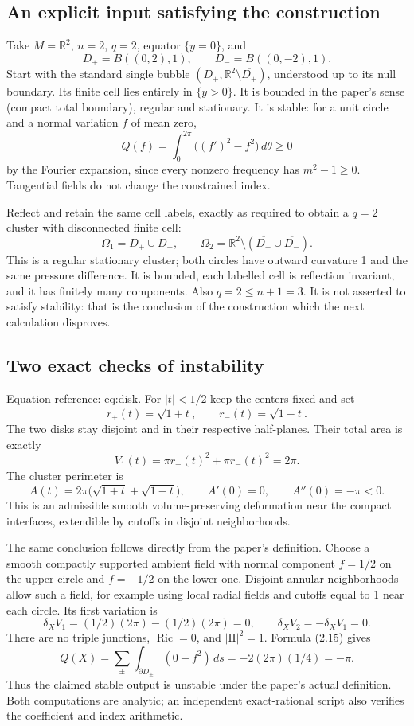 \documentclass[10pt]{article}
\begin{document}
\subsection*{An explicit input satisfying the construction}
Take \(M=\mathbb R^2\), \(n=2\), \(q=2\), equator \(\{y=0\}\), and \[D_+=B((0,2),1),\qquad D_-=B((0,-2),1).\] Start with the standard single bubble \((D_+,\mathbb R^2\setminus\overline{D_+})\), understood up to its null boundary. Its finite cell lies entirely in \(\{y>0\}\). It is bounded in the paper’s sense (compact total boundary), regular and stationary. It is stable: for a unit circle and a normal variation \(f\) of mean zero, \[Q(f)=\int_0^{2\pi}\bigl((f')^2-f^2\bigr)\,d\theta\geq0\] by the Fourier expansion, since every nonzero frequency has \(m^2-1\geq0\). Tangential fields do not change the constrained index.\par
Reflect and retain the same cell labels, exactly as required to obtain a \(q=2\) cluster with disconnected finite cell: \[\Omega_1=D_+\cup D_-,\qquad
 \Omega_2=\mathbb R^2\setminus(\overline{D_+}\cup\overline{D_-}).\] This is a regular stationary cluster; both circles have outward curvature 1 and the same pressure difference. It is bounded, each labelled cell is reflection invariant, and it has finitely many components. Also \(q=2\leq n+1=3\). It is not asserted to satisfy stability: that is the conclusion of the construction which the next calculation disproves.\par
\subsection*{Two exact checks of instability}
Equation reference: eq:disk. For \(|t|<1/2\) keep the centers fixed and set \[r_+(t)=\sqrt{1+t},\qquad r_-(t)=\sqrt{1-t}.\] The two disks stay disjoint and in their respective half-planes. Their total area is exactly \[V_1(t)=\pi r_+(t)^2+\pi r_-(t)^2=2\pi.\] The cluster perimeter is \[A(t)=2\pi\bigl(\sqrt{1+t}+\sqrt{1-t}\bigr),\qquad
 A'(0)=0,\qquad A''(0)=-\pi<0.                 \] This is an admissible smooth volume-preserving deformation near the compact interfaces, extendible by cutoffs in disjoint neighborhoods.\par
The same conclusion follows directly from the paper’s definition. Choose a smooth compactly supported ambient field with normal component \(f=1/2\) on the upper circle and \(f=-1/2\) on the lower one. Disjoint annular neighborhoods allow such a field, for example using local radial fields and cutoffs equal to 1 near each circle. Its first variation is \[\delta_XV_1=(1/2)(2\pi)-(1/2)(2\pi)=0,\qquad
 \delta_XV_2=-\delta_XV_1=0.\] There are no triple junctions, \(\operatorname{Ric}=0\), and \(|\mathrm{II}|^2=1\). Formula (2.15) gives \[Q(X)=\sum_{\pm}\int_{\partial D_\pm}(0-f^2)\,ds
      =-2(2\pi)(1/4)=-\pi.\] Thus the claimed stable output is unstable under the paper’s actual definition. Both computations are analytic; an independent exact-rational script also verifies the coefficient and index arithmetic.\par
\end{document}
